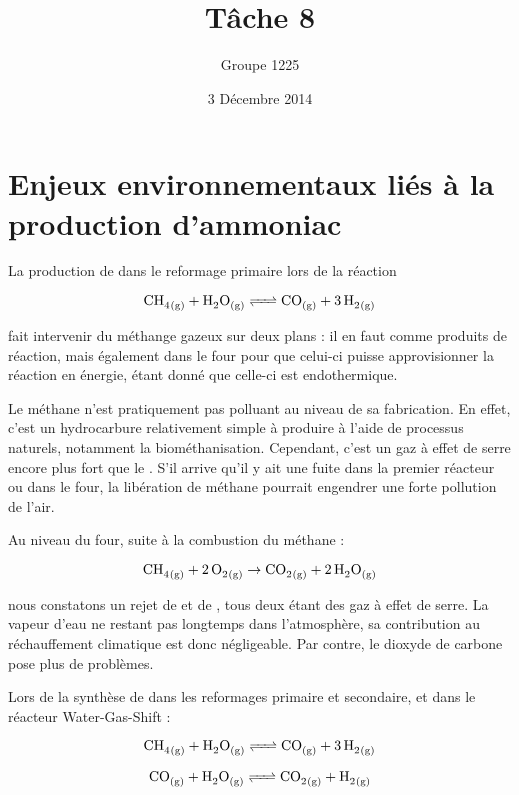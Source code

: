 \documentclass[a4paper, oneside, 12pt]{article}
\title{Tâche 8}
\author{Groupe 1225}
\date{3 Décembre 2014}
\begin{document}
\maketitle

\section*{Enjeux environnementaux liés à la production d'ammoniac}

La production de  dans le reformage primaire lors de la réaction

\begin{equation*}
	\ce{CH4_{(g)} + H2O_{(g)} <=> CO_{(g)} + 3 \, H2_{(g)}} 
\end{equation*}

fait intervenir du méthange gazeux sur deux plans : il en faut comme produits de réaction, 
mais également dans le four pour que celui-ci puisse approvisionner la réaction en énergie, étant donné que celle-ci est endothermique. 

Le méthane n'est pratiquement pas polluant au niveau de sa fabrication. En effet, c'est un hydrocarbure relativement simple à produire à l'aide de processus naturels, notamment la biométhanisation. 
Cependant, c'est un gaz à effet de serre encore plus fort que le .
S'il arrive qu'il y ait une fuite dans la premier réacteur ou dans le four, la libération de méthane pourrait engendrer une forte pollution de l'air.

Au niveau du four, suite à la combustion du méthane : 

\begin{equation*}
	\ce{CH4_{(g)} + 2 \, O2_{(g)} \rightarrow CO2_{(g)} + 2 \, H2O_{(g)}} 
\end{equation*}

nous constatons un rejet de  et de , tous deux étant des gaz à effet de serre. La vapeur d'eau ne restant pas longtemps dans l'atmosphère, sa contribution au réchauffement climatique est donc négligeable. Par contre, le dioxyde de carbone pose plus de problèmes. 

Lors de la synthèse de  dans les reformages primaire et secondaire, et dans le réacteur Water-Gas-Shift : 

\begin{equation*}
	\ce{CH4_{(g)} + H2O_{(g)} <=> CO_{(g)} + 3 \, H2_{(g)}} 
\end{equation*}

\begin{equation*}
	\ce{CO_{(g)} + H2O_{(g)} <=> CO2_{(g)} + H2_{(g)}} 
\end{equation*}
\end{document}
